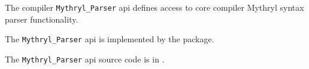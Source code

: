 
The compiler {\tt Mythryl\_Parser} api defines access to core compiler Mythryl syntax 
parser functionality.

The {\tt Mythryl\_Parser} api is implemented by the  package.

The {\tt Mythryl\_Parser} api source code is in .


